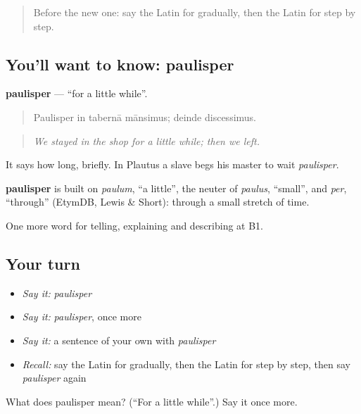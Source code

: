 \begin{quote}
Before the new one: say the Latin for gradually, then the Latin for step by step.
\end{quote}

\subsection*{You'll want to know: paulisper}
\textbf{paulisper} — \textquotedblleft{}for a little while\textquotedblright{}.

\begin{quote}
Paulisper in tabernā mānsimus; deinde discessimus.
\end{quote}

\begin{quote}
\emph{We stayed in the shop for a little while; then we left.}
\end{quote}

It says how long, briefly. In Plautus a slave begs his master to wait \emph{paulisper}.

\begin{cousinweb}
\textbf{paulisper} is built on \emph{paulum}, \textquotedblleft{}a little\textquotedblright{}, the neuter of \emph{paulus}, \textquotedblleft{}small\textquotedblright{}, and \emph{per}, \textquotedblleft{}through\textquotedblright{} (EtymDB, Lewis \& Short): through a small stretch of time.
\end{cousinweb}

\begin{grammarlens}[title={What you've built}]
One more word for telling, explaining and describing at B1.
\end{grammarlens}

\subsection*{Your turn}
\begin{itemize}
\raggedright
  \item \emph{Say it:} \emph{paulisper}
  \item \emph{Say it:} \emph{paulisper}, once more
  \item \emph{Say it:} a sentence of your own with \emph{paulisper}
  \item \emph{Recall:} say the Latin for gradually, then the Latin for step by step, then say \emph{paulisper} again
\end{itemize}

\begin{tcolorbox}[breakable,colback=teal!4,colframe=teal!35!black,title={Before you move on}]
What does paulisper mean? (\textquotedblleft{}For a little while\textquotedblright{}.) Say it once more.
\end{tcolorbox}
